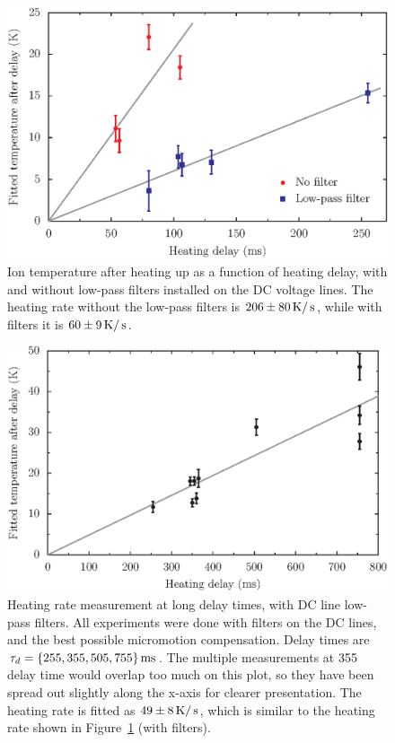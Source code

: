\begin{figure}[h!t]
\centering
\includegraphics{chapter7/heating/filterheating_v4}
\caption[Ion's motional heating rate with/without DC filters]{Ion temperature after heating up as a function of heating delay, with and without low-pass filters installed on the DC voltage lines. The heating rate without the low-pass filters is $206\pm80\,\mbox{K}/\,\mbox{s}$, while with filters it is $60\pm9\,\mbox{K}/\,\mbox{s}$.}
\label{fig:filter_heating}
\end{figure} 

\begin{figure}[h!t]
\centering
\includegraphics{chapter7/heating/long_heating_rate_v3}
\caption[Motional heating rate measurement with long delay times]{Heating rate measurement at long delay times, with DC line low-pass filters. All experiments were done with filters on the DC lines, and the best possible micromotion compensation. Delay times are $\tau_d =  \{255,355,505,755\}\,\mbox{ms}$. The multiple measurements at 355\ms\, delay time would overlap too much on this plot, so they have been spread out slightly along the x-axis for clearer presentation. The heating rate is fitted as $49\pm8\,\mbox{K}/\,\mbox{s}$, which is similar to the heating rate shown in Figure~\ref{fig:filter_heating} (with filters).}
\label{fig:long_heating_rate}
\end{figure} 

